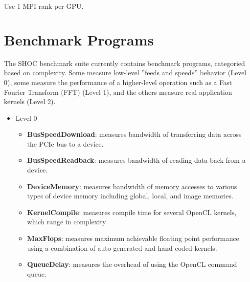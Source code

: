 \documentclass[11pt]{article}
\begin{document}
Use 1 MPI rank per GPU.  


\section{Benchmark Programs}\label{sec:programs}

The SHOC benchmark suite currently contains benchmark programs, categoried
based on complexity.  Some measure low-level ''feeds and speeds'' behavior
(Level 0), some measure the performance of a higher-level operation such 
as a Fast Fourier Transform (FFT) (Level 1), and the others measure 
real application kernels (Level 2).

\newpage 

\begin{itemize}
\item Level 0
    \begin{itemize}
        \item {\bf BusSpeedDownload}: measures bandwidth of transferring data 
         across the PCIe bus to a device.
        \item {\bf BusSpeedReadback}: measures bandwidth of reading data back
        from a device.
        \item {\bf DeviceMemory}: measures bandwidth of memory accesses to 
        various types of device memory including global, local, and image 
        memories.
        \item {\bf KernelCompile}: measures compile time for several OpenCL
        kernels, which range in complexity
        \item {\bf MaxFlops}: measures maximum achievable floating point 
        performance using a combination of auto-generated and hand coded 
        kernels.
        \item {\bf QueueDelay}: measures the overhead of using the OpenCL
        command queue.
    \end{itemize}


\end{itemize}
\end{document}

